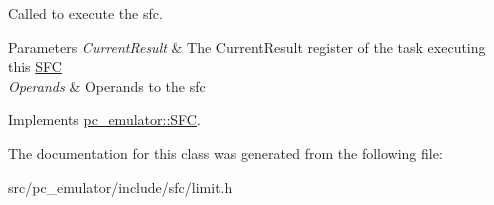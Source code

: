 Called to execute the sfc. 


\begin{DoxyParams}{Parameters}
{\em Current\+Result} & The Current\+Result register of the task executing this \hyperlink{classpc__emulator_1_1SFC}{S\+FC} \\
\hline
{\em Operands} & Operands to the sfc \\
\hline
\end{DoxyParams}


Implements \hyperlink{classpc__emulator_1_1SFC_ab206c80fc0e429c56672b4f6a0ca8635}{pc\+\_\+emulator\+::\+S\+FC}.



The documentation for this class was generated from the following file\+:\begin{DoxyCompactItemize}
\item 
src/pc\+\_\+emulator/include/sfc/limit.\+h\end{DoxyCompactItemize}

